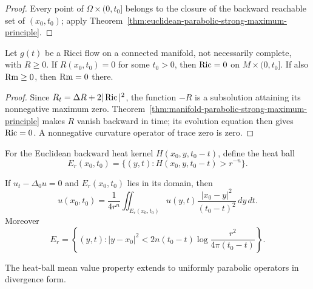 \begin{proof}
\sketch
Every point of $\Omega\times(0,t_0]$ belongs to the closure of the backward
reachable set of $(x_0,t_0)$; apply
Theorem~\ref{thm:euclidean-parabolic-strong-maximum-principle}.
\end{proof}

\begin{corollary}
\label{cor:ricci-flow-scalar-curvature-strong-maximum-principle}


Let $g(t)$ be a Ricci flow on a connected manifold, not necessarily complete,
with $R\geq0$.  If $R(x_0,t_0)=0$ for some $t_0>0$, then
$\operatorname{Ric}=0$ on $M\times(0,t_0]$.  If also $\operatorname{Rm}\geq0$, then $\operatorname{Rm}=0$ there.
\end{corollary}

\begin{proof}
\sketch
Since $R_t=\Delta R+2|\operatorname{Ric}|^2$, the function $-R$ is a subsolution attaining
its nonnegative maximum zero.  Theorem~\ref{thm:manifold-parabolic-strong-maximum-principle}
makes $R$ vanish backward in time; its evolution equation then gives
$\operatorname{Ric}=0$.  A nonnegative curvature operator of trace zero is zero.
\end{proof}

For the Euclidean backward heat kernel $H(x_0,y,t_0-t)$, define the heat ball
\[
E_r(x_0,t_0)=\{(y,t):H(x_0,y,t_0-t)>r^{-n}\}.
\]

\begin{corollary}
\label{cor:euclidean-heat-mean-value-property}

If $u_t-\Delta_0u=0$ and $E_r(x_0,t_0)$ lies in its domain, then
\[
u(x_0,t_0)=\frac1{4r^n}\iint_{E_r(x_0,t_0)}
u(y,t)\frac{|x_0-y|^2}{(t_0-t)^2}\,dy\,dt.
\]
Moreover
\[
E_r=\left\{(y,t):|y-x_0|^2<2n(t_0-t)
\log\frac{r^2}{4\pi(t_0-t)}\right\}.
\]
\end{corollary}

\begin{remark}
\label{rem:divergence-form-mean-value-property}


The heat-ball mean value property extends to uniformly parabolic operators in
divergence form.
\end{remark}

